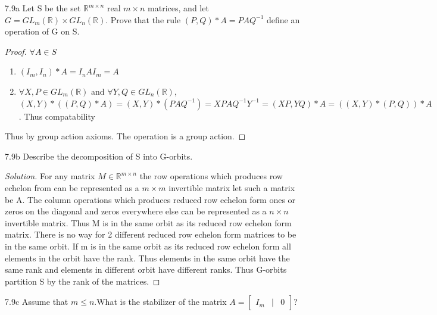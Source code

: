 \documentclass{article}
\newcommand{\R}{\mathbb{R}}
\newenvironment{solution}
{\renewcommand\qedsymbol{$\blacksquare$}\begin{proof}[Solution]}
{\end{proof}}
\begin{document}
\bigskip

\begin{PROB}{7.9a}\label{Problem 7.9a.}
    Let S be the set $\R^{m \times n}$ real $m \times n$ matrices, and let $G= GL_m(\R) \times GL_n(\R)$. 
    Prove that the rule $(P, Q) * A = PAQ^{-1}$ define an operation of G on S.
\end{PROB}
\begin{proof}
    $\forall A \in S$
    \begin{enumerate}{}
        \item $(I_m, I_n) * A = I_n A I_m = A$
        \item $\forall X, P \in GL_m(\R)$ and $\forall Y, Q \in GL_n(\R)$, $(X, Y) * ((P, Q) * A) = (X, Y) * (PAQ^{-1}) = XPAQ^{-1}Y^{-1} = (XP, YQ) \ast A = ((X, Y) \ast (P, Q)) * A$. Thus compatability
    \end{enumerate}

    Thus by group action axioms. The operation is a group action.
\end{proof}
\begin{PROB}{7.9b}\label{Problem 7.9b.}
    Describe the decomposition of S into G-orbits.
\end{PROB}
\begin{solution}
    For any matrix $M \in \R^{m \times n}$ the row operations which produces row echelon from can be represented as a $m \times m$ invertible matrix let such a matrix be A. The column operations which produces reduced row echelon form ones or zeros on the diagonal and zeros everywhere else can be represented as a $n \times n$ invertible matrix. Thus M is in the same orbit as its reduced row echelon form matrix. There is no way for 2 different reduced row echelon form matrices to be in the same orbit. If m is in the same orbit as its reduced row echelon form all elements in the orbit have the rank. Thus elements in the same orbit have the same rank and elements in different orbit have different ranks. Thus G-orbits partition S by the rank of the matrices.
\end{solution}
\begin{PROB}{7.9c}\label{Problem 7.9c.}
    Assume that $m \leq n$.What  is the stabilizer of the matrix $A = \begin{bmatrix}
        I_m & \vert & 0
    \end{bmatrix}$?
\end{PROB}
\end{document}
